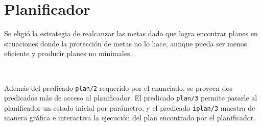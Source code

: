 \documentclass[a4paper,12pt]{report}
\begin{document}
\chapter{Planificador}

Se eligi\'{o} la estrategia de realcanzar las metas dado que logra encontrar 
planes en situaciones donde la protecci\'{o}n de metas no lo hace, aunque pueda 
ser menos eficiente y producir planes no minimales.

\ 

Adem\'{a}s del predicado \texttt{plan/2} requerido por el enunciado, se proveen
dos predicados m\'{a}s de acceso al planificador. El predicado \texttt{plan/3}
permite pasarle al planificador un estado inicial por par\'{a}metro, y el 
predicado \texttt{iplan/3} muestra de manera gr\'{a}fica e interactiva la 
ejecuci\'{o}n del plan encontrado por el planificador. 
\end{document}
